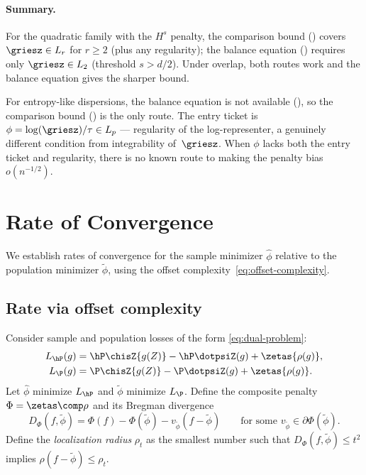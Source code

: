 \documentclass{article}
\begin{document}
\paragraph{Summary.}
For the quadratic family
with the $H^s$ penalty,
the comparison bound
()
covers
$\griesz \in L_r$ for $r \ge 2$
(plus any regularity);
the balance equation
()
requires only $\griesz \in L_2$
(threshold $s > d/2$).
Under overlap,
both routes work
and the balance equation gives
the sharper bound.

For entropy-like dispersions,
the balance equation is not available
(),
so the comparison bound
()
is the only route.
The entry ticket is
$\phi = \log(\griesz)/\tau
  \in L_p$
--- regularity of the log-representer,
a genuinely different condition
from integrability of~$\griesz$.
When $\phi$ lacks
both the entry ticket and regularity,
there is no known route
to making the penalty bias
$o(n^{-1/2})$.


\section{Rate of Convergence}
\label{sec:rate-of-convergence}

We establish rates of convergence for the sample minimizer $\hat\phi$ relative to the population minimizer $\tilde\phi$, using the offset complexity~\eqref{eq:offset-complexity}.

\subsection{Rate via offset complexity}

Consider sample and population losses of the form \eqref{eq:dual-problem}:
\begin{align*}
L_{\hP}(g) &= \hP \chisZ\{g(Z)\} - \hP \dotpsiZ(g) + \zetas\{\rho(g)\}, \\
L_{\P}(g) &= \P \chisZ\{g(Z)\} - \P \dotpsiZ(g) + \zetas\{\rho(g)\}.
\end{align*}
Let $\hat\phi$ minimize $L_{\hP}$ and $\tilde\phi$ minimize $L_{\P}$.
Define the composite penalty $\Phi = \zetas \comp \rho$
and its Bregman divergence
\[
D_\Phi(f, \tilde\phi)
  = \Phi(f) - \Phi(\tilde\phi)
  - v_{\tilde\phi}(f - \tilde\phi)
\qquad \text{for some } v_{\tilde\phi} \in \partial\Phi(\tilde\phi).
\]
Define the \emph{localization radius} $\rho_t$
as the smallest number such that
$D_\Phi(f, \tilde\phi) \le t^2$ implies
$\rho(f - \tilde\phi) \le \rho_t$.
\end{document}
